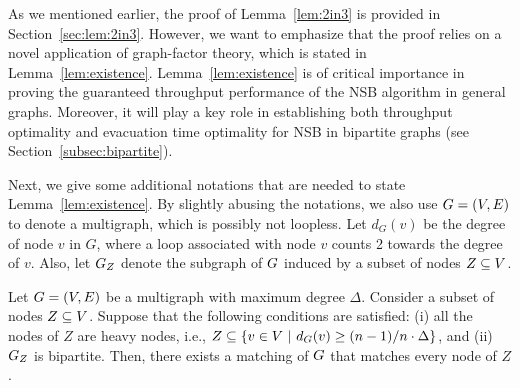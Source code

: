 \documentclass[10pt,journal,compsoc]{IEEEtran}
\begin{document}
As we mentioned earlier, the proof of Lemma~\ref{lem:2in3} is provided in Section~\ref{sec:lem:2in3}. 
However, we want to emphasize that the proof relies on a novel application of graph-factor theory, 
which is stated in Lemma~\ref{lem:existence}.
Lemma~\ref{lem:existence} is of critical importance in proving the guaranteed
throughput performance of the NSB algorithm in general graphs. Moreover, it will play a key 
role in establishing both throughput optimality and evacuation time optimality for NSB in bipartite 
graphs (see Section~\ref{subsec:bipartite}).

Next, we give some additional notations that are needed to state Lemma~\ref{lem:existence}.
By slightly abusing the notations, we also use $G=(V, E)$ to denote a multigraph,
which is possibly not loopless. 
Let $d_G(v)$ be the degree of node $v$ in $G$, where a loop associated with node $v$ counts 2 
towards the degree of $v$. 
Also, let $G_Z$ denote the subgraph of $G$ induced by a subset of nodes $Z \subseteq V$. 

\begin{lemma}
\label{lem:existence}
Let $G=(V, E)$ be a multigraph with maximum degree $\Delta$.
Consider a subset of nodes $Z \subseteq V$.
Suppose that the following conditions are satisfied: 
(i) all the nodes of $Z$ are heavy nodes, i.e., $Z \subseteq \{v \in V ~|~ d_{G}(v) \ge (n-1)/n \cdot \Delta\}$, 
and (ii) $G_Z$ is bipartite. Then, there exists a matching of $G$ that matches every node of $Z$.
\end{lemma}
\end{document}
